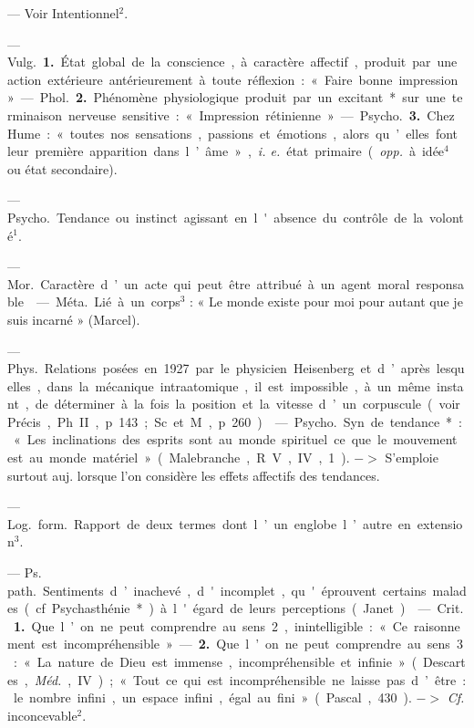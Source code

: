 \begin{itemize}[leftmargin=1cm, label=, itemsep=1pt]
 — Voir Intentionnel$^2$.

 — \si{Vulg.} {\bf 1.} État global de
la conscience, à caractère affectif,
produit par une action extérieure
antérieurement à toute réflexion :
« Faire bonne impression ».

— \si{Phol.} {\bf 2.} Phénomène physiologique produit par un excitant* sur
une terminaison nerveuse sensitive :
« Impression rétinienne ».

— \si{Psycho.} {\bf 3.} Chez Hume : « toutes
nos sensations, passions et émotions,
alors qu’elles font leur première
apparition dans l’âme », {\it i. e.} état
primaire ({\it opp.} à idée$^4$ ou état secondaire).

 — \si{Psycho.} Tendance ou
instinct agissant en l'absence du
contrôle de la volonté$^1$.

 — \si{Mor.} Caractère d’un
acte qui peut être attribué à un
agent moral responsable.

 — \si{Méta.} Lié à un corps$^3$ :
« Le monde existe pour moi pour
autant que je suis incarné » (Marcel).

 — \si{Phys.}
Relations posées en 1927 par le
physicien Heisenberg et d’après
lesquelles, dans la mécanique intraatomique, il est impossible, à un
même instant, de déterminer à la
fois la position et la vitesse d’un
corpuscule (voir Précis, Ph. II,
p. 143; Sc. et M., p. 260).

 — \si{Psycho.} Syn. de tendance* : « Les inclinations des esprits
sont au monde spirituel ce que le
mouvement est au monde matériel »
(Malebranche, R. V., IV, 1). $->$
S'emploie surtout auj. lorsque l’on
considère les effets affectifs des tendances.

 — \si{Log.} \si{form.} Rapport de
deux termes dont l’un englobe
l’autre en extension$^3$.

 — \si{Ps. path.} Sentiments d’inachevé, d'incomplet, qu'éprouvent certains malades (cf. Psychasthénie*) à l'égard
de leurs perceptions (Janet).

 — \si{Crit.} {\bf 1.} Que
l’on ne peut comprendre au sens 2,
inintelligible : « Ce raisonnement est
incompréhensible ». — {\bf 2.} Que l’on
ne peut comprendre au sens 3 : « La
nature de Dieu est immense, incompréhensible et infinie » (Descartes,
\si{{\it Méd.}}, IV) ; « Tout ce qui est
incompréhensible ne laisse pas d’être:
le nombre infini, un espace infini,
égal au fini » (Pascal, 430). $->$
{\it {\it Cf.}} inconcevable$^2$.


\end{itemize}
